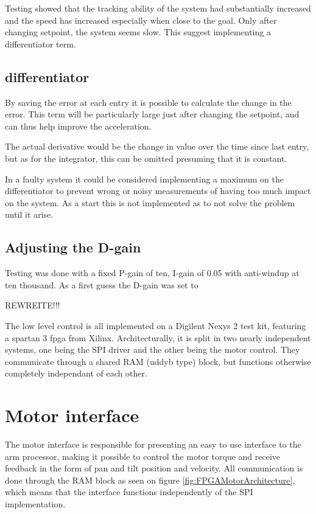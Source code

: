 Testing showed that the tracking ability of the system had substantially increased and the speed has increased especially when close to the goal. Only after changing setpoint, the system seems slow. This suggest implementing a differentiator term.

\subsection{differentiator}
By saving the error at each entry it is possible to calculate the change in the error. This term will be particularly large just after changing the setpoint, and can thus help improve the acceleration.

The actual derivative would be the change in value over the time since last entry, but as for the integrator, this can be omitted presuming that it is constant.

In a faulty system it could be considered implementing a maximum on the differentiator to prevent wrong or noisy measurements of having too much impact on the system. As a start this is not implemented as to not solve the problem until it arise.

\subsection{Adjusting the D-gain}
Testing was done with a fixed P-gain of ten, I-gain of 0.05 with anti-windup at ten thousand. As a first guess the D-gain was set to






REWREITE!!!

The low level control is all implemented on a Digilent Nexys 2 test kit, featuring a spartan 3 fpga from Xilinx.
Architecturally, it is split in two nearly independent systems, one being the SPI driver and the other being the motor control.
They communicate through a shared RAM (uddyb type) block, but functions otherwise completely independant of each other.


\section{Motor interface}
The motor interface is responsible for presenting an easy to use interface to the arm processor, making it possible to control the motor torque and receive feedback in the form of pan and tilt position and velocity.
All communication is done through the RAM block as seen on figure \ref{fig:FPGAMotorArchitecture}, which means that the interface functions independently of the SPI implementation.

